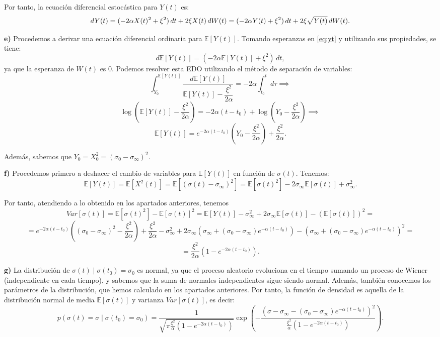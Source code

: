 \documentclass[12pt]{article}
\begin{document}
Por tanto, la ecuación diferencial estocástica para $Y(t)$ es:
\begin{equation}
  \label{eq:yt}
dY(t)= (-2\alpha X(t)^2 + \xi^2)\, dt + 2\xi X(t)\, dW(t) = (-2\alpha Y(t) + \xi^2)\, dt + 2\xi \sqrt{Y(t)}\, dW(t).\\
\end{equation}

\textbf{e)} Procedemos a derivar una ecuación diferencial ordinaria para $\mathbb E[Y(t)]$. Tomando esperanzas en \eqref{eq:yt} y utilizando sus propiedades, se tiene:
\[
d \mathbb E[Y(t)] = (-2\alpha\mathbb E[Y(t)]+\xi^2)\, dt,
\]
ya que la esperanza de $W(t)$ es 0. Podemos resolver esta EDO utilizando el método de separación de variables:
\[
\int_{Y_0}^{\mathbb E[Y(t)]}\frac{d\mathbb E[Y(t)]}{\mathbb E[Y(t)]-\dfrac{\xi^2}{2\alpha}}=-2\alpha \int_{t_0}^t d\tau \implies
\]
\[
\log(\mathbb E[Y(t)] - \frac{\xi^2}{2\alpha}) = -2\alpha(t-t_0) + \log(Y_0 - \frac{\xi^2}{2\alpha}) \implies
\]
\[
\mathbb E[Y(t)]=e^{-2\alpha(t-t_0)}\left(Y_0 - \frac{\xi^2}{2\alpha}\right) + \frac{\xi^2}{2\alpha}.
\]

Además, sabemos que $Y_0=X_0^2=(\sigma_0-\sigma_{\infty})^2$.

\textbf{f)} Procedemos primero a deshacer el cambio de variables para $\mathbb E[Y(t)]$ en función de $\sigma(t)$. Tenemos:
\[
\mathbb E[Y(t)] = \mathbb E[X^2(t)] = \mathbb E[(\sigma(t) - \sigma_\infty)^2] = \mathbb E[\sigma(t)^2] - 2\sigma_\infty \mathbb E[\sigma(t)] + \sigma_\infty^2.
\]

Por tanto, atendiendo a lo obtenido en los apartados anteriores, tenemos
\[
Var[\sigma(t)]=\mathbb E[\sigma(t)^2] - \mathbb E[\sigma(t)]^2 = \mathbb E[Y(t)]-\sigma_\infty^2 + 2\sigma_{\infty}\mathbb E[\sigma(t)] - (\mathbb E[\sigma(t)])^2 =
\]
\[
=e^{-2\alpha(t-t_0)}\left((\sigma_0-\sigma_{\infty})^2 - \frac{\xi^2}{2\alpha}\right) + \frac{\xi^2}{2\alpha}-\sigma_\infty^2 + 2\sigma_{\infty}\left(\sigma_\infty + (\sigma_0 - \sigma_\infty)e^{-\alpha(t-t_0)} \right) - \left(\sigma_\infty + (\sigma_0 - \sigma_\infty)e^{-\alpha(t-t_0)}\right)^2 =
\]
\[
= \frac{\xi^2}{2\alpha}\left(1 - e^{-2\alpha(t-t_0)}\right).
\]

\textbf{g)} La distribución de $\sigma(t)\mid \sigma(t_0)=\sigma_0$ es normal, ya que el proceso aleatorio evoluciona en el tiempo sumando un proceso de Wiener (independiente en cada tiempo), y sabemos que la suma de normales independientes sigue siendo normal. Además, también conocemos los parámetros de la distribución, que hemos calculado en los apartados anteriores. Por tanto, la función de densidad es aquella de la distribución normal de media $\mathbb E[\sigma(t)]$ y varianza $Var[\sigma(t)]$, es decir:
\[
p(\sigma(t)=\sigma\mid \sigma(t_0)=\sigma_0) = \frac{1}{\displaystyle \sqrt{\pi \frac{\xi^2}{\alpha}\left(1 - e^{-2\alpha(t-t_0)}\right)}}\exp\left( -\frac{\left(\sigma - \sigma_\infty - (\sigma_0 - \sigma_\infty)e^{-\alpha(t-t_0)} \right)^2}{\displaystyle \frac{\xi^2}{\alpha}\left(1 - e^{-2\alpha(t-t_0)}\right)}\right).
\]
\end{document}
